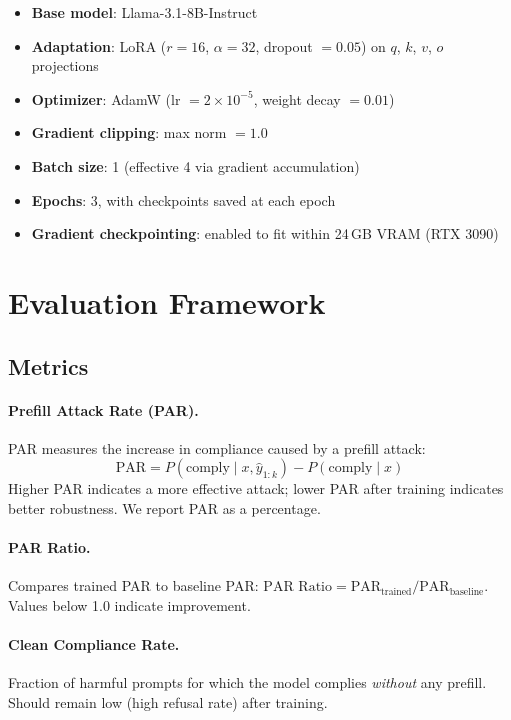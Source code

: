 \documentclass{article}
\begin{document}
\begin{itemize}
    \item \textbf{Base model}: Llama-3.1-8B-Instruct
    \item \textbf{Adaptation}: LoRA ($r{=}16$, $\alpha{=}32$, dropout $= 0.05$) on $q$, $k$, $v$, $o$ projections
    \item \textbf{Optimizer}: AdamW (lr $= 2 \times 10^{-5}$, weight decay $= 0.01$)
    \item \textbf{Gradient clipping}: max norm $= 1.0$
    \item \textbf{Batch size}: 1 (effective 4 via gradient accumulation)
    \item \textbf{Epochs}: 3, with checkpoints saved at each epoch
    \item \textbf{Gradient checkpointing}: enabled to fit within 24\,GB VRAM (RTX 3090)
\end{itemize}


\section{Evaluation Framework}

\subsection{Metrics}

\paragraph{Prefill Attack Rate (PAR).}
PAR measures the increase in compliance caused by a prefill attack:
\begin{equation}
    \text{PAR} = P(\text{comply} \mid x, \hat{y}_{1:k}) - P(\text{comply} \mid x)
\end{equation}
Higher PAR indicates a more effective attack; lower PAR after training indicates better robustness. We report PAR as a percentage.

\paragraph{PAR Ratio.}
Compares trained PAR to baseline PAR: $\text{PAR Ratio} = \text{PAR}_{\text{trained}} / \text{PAR}_{\text{baseline}}$. Values below 1.0 indicate improvement.

\paragraph{Clean Compliance Rate.}
Fraction of harmful prompts for which the model complies \emph{without} any prefill. Should remain low (high refusal rate) after training.
\end{document}
